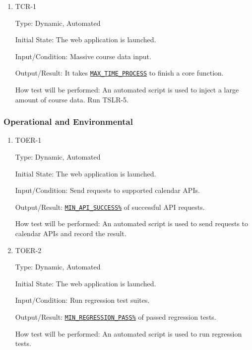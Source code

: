 \documentclass[12pt, titlepage]{article}
\begin{document}
\begin{enumerate}
\begin{enumerate}

\item{TCR-1\\}\label{TCR-2}

Type: Dynamic, Automated
					
Initial State: The web application is launched.
					
Input/Condition: Massive course data input.
					
Output/Result: It takes \hyperref[MAX_TIME_PROCESS]{\texttt{MAX\_TIME\_PROCESS}} to finish a core function.
					
How test will be performed: An automated script is used to inject a large amount of course data.  Run TSLR-5.

\end{enumerate}

\subsubsection{Operational  and Environmental}

\begin{enumerate}
\item{TOER-1\\}\label{TOER-1}

Type: Dynamic, Automated
					
Initial State: The web application is launched.
					
Input/Condition: Send requests to supported calendar APIs.
					
Output/Result: \hyperref[MIN_API_SUCCESS]{\texttt{MIN\_API\_SUCCESS\%}} of successful API requests.
					
How test will be performed: An automated script is used to send requests to calendar APIs and record the result.


\item{TOER-2\\}\label{TOER-2}

Type: Dynamic, Automated
					
Initial State: The web application is launched.
					
Input/Condition: Run regression test suites.
					
Output/Result: \hyperref[MIN_REGRESSION_PASS]{\texttt{MIN\_REGRESSION\_PASS\%}} of passed regression tests.
					
How test will be performed: An automated script is used to run regression tests.


\end{enumerate}
\end{enumerate}
\end{document}
